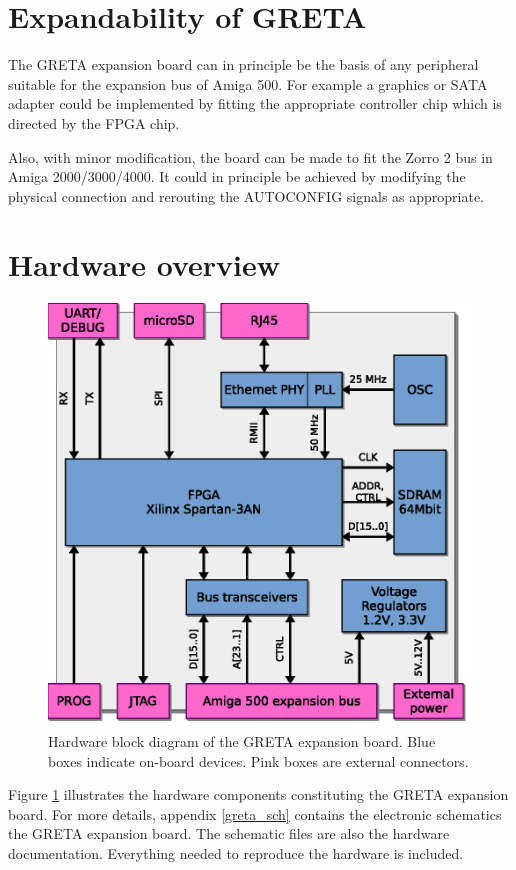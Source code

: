 \documentclass[a4paper]{report}
\begin{document}
\section{Expandability of GRETA}
The GRETA expansion board can in principle be the basis of any
peripheral suitable for the expansion bus of Amiga 500. For
example a graphics or SATA adapter could be implemented by
fitting the appropriate controller chip which is directed by
the FPGA chip.

Also, with minor modification, the board can be made to fit
the Zorro 2 bus in Amiga 2000/3000/4000. It could in principle
be achieved by modifying the physical connection and rerouting
the AUTOCONFIG signals as appropriate.

\section{Hardware overview}
\begin{figure}
\centering
\includegraphics{hw_overview.eps}
\caption{Hardware block diagram of the GRETA expansion
board. Blue boxes indicate on-board devices. Pink boxes are
external connectors.}
\label{hw_overview}
\end{figure}

Figure \ref{hw_overview} illustrates the hardware components
constituting the GRETA expansion board.  For more details,
appendix \ref{greta_sch} contains the electronic schematics
the GRETA expansion board. The schematic files are also the
hardware documentation. Everything needed to reproduce the
hardware is included.
\end{document}
